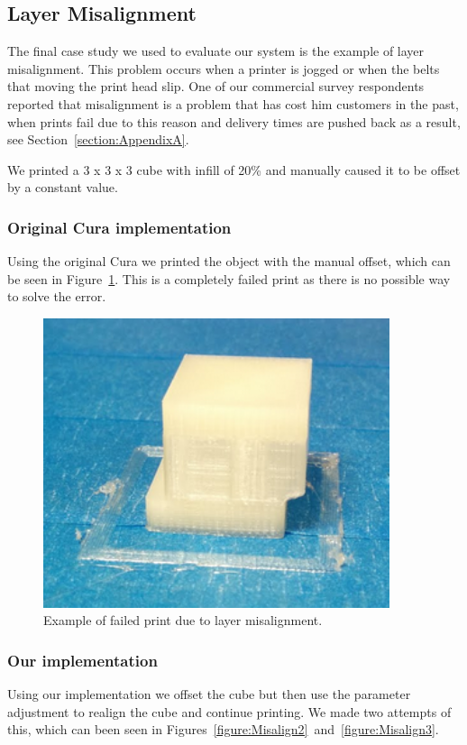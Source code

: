 \documentclass[pdftex, 11pt]{report} %
\begin{document}
\subsection{Layer Misalignment}
The final case study we used to evaluate our system is the example of layer misalignment. This problem occurs when a printer is jogged or when the belts that moving the print head slip. One of our commercial survey respondents reported that misalignment is a problem that has cost him customers in the past, when prints fail due to this reason and delivery times are pushed back as a result, see Section~\ref{section:AppendixA}.

We printed a 3 x 3 x 3 cube with infill of 20\% and manually caused it to be offset by a constant value.

\subsubsection{Original Cura implementation}
Using the original Cura we printed the object with the manual offset, which can be seen in Figure~\ref{figure:Misalign1}. This is a completely failed print as there is no possible way to solve the error. 

\begin{figure}[H]
  \centering
  \includegraphics[width=4in]{Misalign1.png}
  \caption{Example of failed print due to layer misalignment.}
  \label{figure:Misalign1}
\end{figure}

\subsubsection{Our implementation}
Using our implementation we offset the cube but then use the parameter adjustment to realign the cube and continue printing. We made two attempts of this, which can been seen in Figures~\ref{figure:Misalign2}~and~\ref{figure:Misalign3}.
\end{document}

